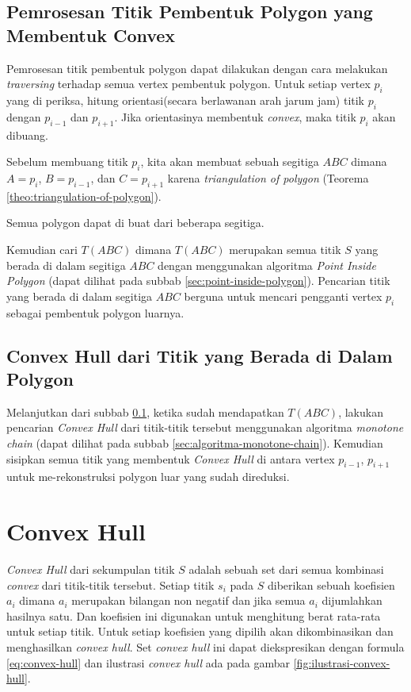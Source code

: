 \subsection{ Pemrosesan Titik Pembentuk Polygon yang Membentuk Convex}
\label{sec:pemrosesan-titik-pembentuk-polygon-yang-membentuk-convex}
Pemrosesan titik pembentuk polygon dapat dilakukan dengan cara melakukan \textit{traversing} terhadap semua vertex pembentuk polygon. Untuk setiap vertex $p_i$ yang di periksa, hitung orientasi(secara berlawanan arah jarum jam) titik $p_i$ dengan $p_{i-1}$ dan $ p_{i+1}$. Jika orientasinya membentuk \textit{convex}, maka titik $p_i$ akan dibuang.
\par Sebelum membuang titik $p_i$, kita akan membuat sebuah segitiga $ABC$ dimana $A=p_i$, $B=p_{i-1}$, dan $C=p_{i+1}$ karena \textit{triangulation of polygon} (Teorema \ref{theo:triangulation-of-polygon}).
\begin{theo}
    \label{theo:triangulation-of-polygon}
	Semua polygon dapat di buat dari beberapa segitiga.
\end{theo}
Kemudian cari $T(ABC)$ dimana $T(ABC)$ merupakan semua titik $S$ yang berada di dalam segitiga $ABC$ dengan menggunakan algoritma \textit{Point Inside Polygon} (dapat dilihat pada subbab \ref{sec:point-inside-polygon}). Pencarian titik yang berada di dalam segitiga $ABC$ berguna untuk mencari pengganti vertex $p_i$ sebagai pembentuk polygon luarnya.

\subsection{ Convex Hull dari Titik yang Berada di Dalam Polygon}
\label{sec:convex-hull-dari-titik-yang-berada-di-dalam-polygon}
Melanjutkan dari subbab \ref{sec:pemrosesan-titik-pembentuk-polygon-yang-membentuk-convex}, ketika sudah mendapatkan $T(ABC)$, lakukan pencarian \textit{Convex Hull} dari titik-titik tersebut menggunakan algoritma \textit{monotone chain} (dapat dilihat pada subbab \ref{sec:algoritma-monotone-chain}). Kemudian sisipkan semua titik yang membentuk \textit{Convex Hull} di antara vertex $p_{i-1}$, $p_{i+1}$ untuk me-rekonstruksi polygon luar yang sudah direduksi.

\section{ Convex Hull}
\label{sec:convex-hull}
\textit{Convex Hull} dari sekumpulan titik $S$ adalah sebuah set dari semua kombinasi \textit{convex} dari titik-titik tersebut. Setiap titik $s_i$ pada $S$ diberikan sebuah koefisien $a_i$ dimana $a_i$ merupakan bilangan non negatif dan jika semua $a_i$ dijumlahkan hasilnya satu. Dan koefisien ini digunakan untuk menghitung berat rata-rata untuk setiap titik. Untuk setiap koefisien yang dipilih akan dikombinasikan dan menghasilkan \textit{convex hull}. Set \textit{convex hull} ini dapat diekspresikan dengan formula \eqref{eq:convex-hull} dan ilustrasi \textit{convex hull} ada pada gambar \ref{fig:ilustrasi-convex-hull}.

